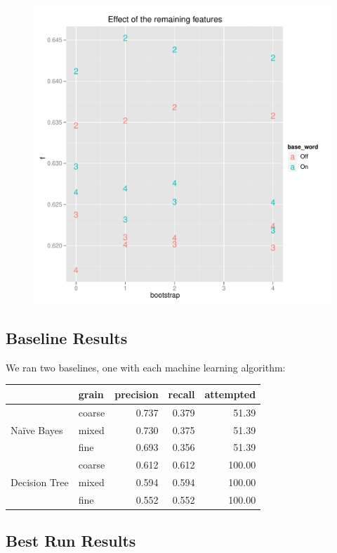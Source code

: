 \documentclass{article}
\newcommand{\Naive}{Na\"ive}
\begin{document}
\begin{figure}
\includegraphics[width=\textwidth]{pg_0004}
\caption{\label{fig4}}
\end{figure}

\subsection{Baseline Results}

We ran two baselines, one with each machine learning algorithm:

\begin{tabular}{l l | r r r}
& grain& precision& recall& attempted\\
\hline
\multirow{3}{*}{\Naive{} Bayes} &
coarse  &  0.737 & 0.379 &   51.39\\
&mixed  &  0.730 & 0.375 &   51.39\\
& fine  &  0.693 & 0.356 &   51.39\\
\multirow{3}{*}{Decision Tree} &
coarse  &  0.612 & 0.612 &  100.00\\
&mixed  &  0.594 & 0.594 &  100.00\\
& fine  &  0.552 & 0.552 &  100.00\\
\end{tabular}

\subsection{Best Run Results}
\end{document}
